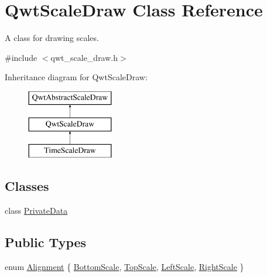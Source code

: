 \hypertarget{class_qwt_scale_draw}{\section{Qwt\-Scale\-Draw Class Reference}
\label{class_qwt_scale_draw}
}


A class for drawing scales.  




{\ttfamily \#include $<$qwt\-\_\-scale\-\_\-draw.\-h$>$}

Inheritance diagram for Qwt\-Scale\-Draw\-:\begin{figure}[H]
\begin{center}
\leavevmode
\includegraphics[height=3.000000cm]{class_qwt_scale_draw}
\end{center}
\end{figure}
\subsection*{Classes}
\begin{DoxyCompactItemize}
\item 
class \hyperlink{class_qwt_scale_draw_1_1_private_data}{Private\-Data}
\end{DoxyCompactItemize}
\subsection*{Public Types}
\begin{DoxyCompactItemize}
\item 
enum \hyperlink{class_qwt_scale_draw_acd7ceeeac592ef08530788580b461c66}{Alignment} \{ \hyperlink{class_qwt_scale_draw_acd7ceeeac592ef08530788580b461c66a0e16389e135da75f06117d1ee3ef765f}{Bottom\-Scale}, 
\hyperlink{class_qwt_scale_draw_acd7ceeeac592ef08530788580b461c66a2386da707d8f736701b8ab98f778648c}{Top\-Scale}, 
\hyperlink{class_qwt_scale_draw_acd7ceeeac592ef08530788580b461c66af2a8239964381f18dbd08d4a93a7fa23}{Left\-Scale}, 
\hyperlink{class_qwt_scale_draw_acd7ceeeac592ef08530788580b461c66a84d42042d94ae7726395ceb578225e1e}{Right\-Scale}
 \}
\end{DoxyCompactItemize}
